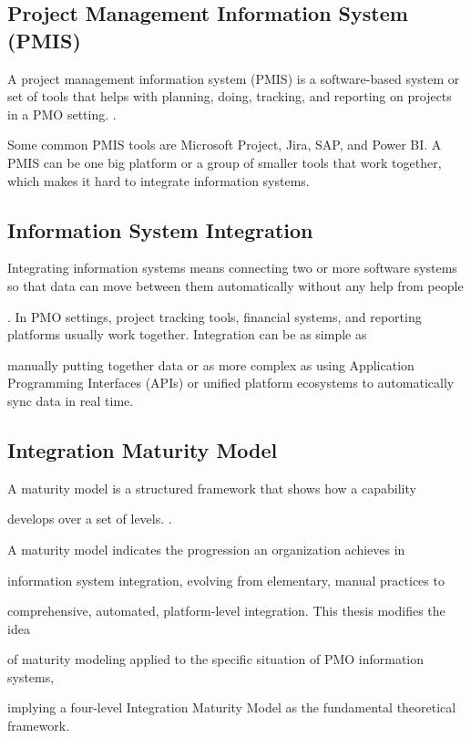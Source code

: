   

\subsection{Project Management Information System (PMIS)} 

A project management information system (PMIS) is a software-based system or set of tools that helps with planning, doing, tracking, and reporting on projects in a PMO setting. \cite{laudon2015}.  

Some common PMIS tools are Microsoft Project, Jira, SAP, and Power BI. A PMIS can be one big platform or a group of smaller tools that work together, which makes it hard to integrate information systems. 

\subsection{Information System Integration} 

Integrating information systems means connecting two or more software systems so that data can move between them automatically without any help from people

\cite{hohpe2004}. In PMO settings, project tracking tools, financial systems, and reporting platforms usually work together. Integration can be as simple as 

manually putting together data or as more complex as using Application Programming Interfaces (APIs) or unified platform ecosystems to automatically sync data in
real time.  

\subsection{Integration Maturity Model} 

A maturity model is a structured framework that shows how a capability 

 develops over a set of levels. \cite{paulk1993}.  

A maturity model indicates the progression an organization achieves in  

information system integration, evolving from elementary, manual practices to  

comprehensive, automated, platform-level integration. This thesis modifies the idea 

 of maturity modeling applied to the specific situation of PMO information systems,  

implying a four-level Integration Maturity Model as the fundamental theoretical framework. 

